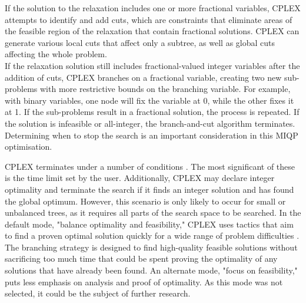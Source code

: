 \documentclass{article}
\begin{document}
If the solution to the relaxation includes one or more fractional variables, CPLEX attempts to identify and add cuts, which are constraints that eliminate areas of the feasible region of the relaxation that contain fractional solutions. CPLEX can generate various local cuts that affect only a subtree, as well as global cuts affecting the whole problem.\\

If the relaxation solution still includes fractional-valued integer variables after the addition of cuts, CPLEX branches on a fractional variable, creating two new sub-problems with more restrictive bounds on the branching variable. For example, with binary variables, one node will fix the variable at 0, while the other fixes it at 1. If the sub-problems result in a fractional solution, the process is repeated. If the solution is infeasible or all-integer, the branch-and-cut algorithm terminates.\\

Determining when to stop the search is an important consideration in this \ac{MIQP} optimisation.

CPLEX terminates under a number of conditions \cite{ibm-terminating}. The most significant of these is the time limit set by the user. Additionally, CPLEX may declare integer optimality and terminate the search if it finds an integer solution and has found the global optimum. However, this scenario is only likely to occur for small or unbalanced trees, as it requires all parts of the search space to be searched. In the default mode, "balance optimality and feasibility," CPLEX uses tactics that aim to find a proven optimal solution quickly for a wide range of problem difficulties \cite{ibm-performance}. The branching strategy is designed to find high-quality feasible solutions without sacrificing too much time that could be spent proving the optimality of any solutions that have already been found.
An alternate mode, "focus on feasibility," puts less emphasis on analysis and proof of optimality. As this mode was not selected, it could be the subject of further research.\\
\end{document}
